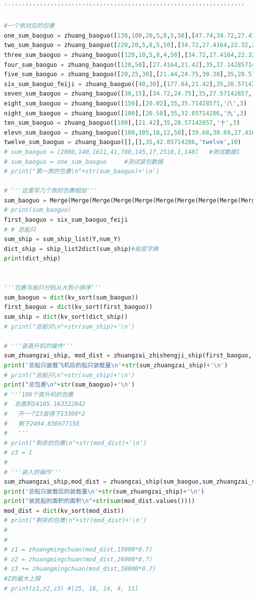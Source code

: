 \documentclass{whutmod}
\begin{document}
\begin{lstlisting}[language=python]
''''''''''''''''''''''''''''''''''''''''''''''''''''''''''''''''''''

#一个旅对应的包裹
one_sum_baoguo = zhuang_baoguo([130,100,20,5,8,5,50],[47.74,34.72,27.4164,22.32,21.44,24.75,21.42],54,43.51851852,'一',12)
two_sum_baoguo = zhuang_baoguo([220,20,5,8,5,50],[34.72,27.4164,22.32,21.44,24.75,21.42],54,43.51851852,'二',3)
three_sum_baoguo = zhuang_baoguo([120,10,5,8,4,50],[34.72,27.4164,22.32,21.44,24.75,21.42],54,41.6666667,'三',3)
four_sum_baoguo = zhuang_baoguo([120,50],[27.4164,21.42],35,37.14285714,'四',3)
five_sum_baoguo = zhuang_baoguo([20,25,30],[21.44,24.75,30.38],35,28.5714285,'五',3)
six_sum_baoguo_feiji = zhuang_baoguo([40,30],[177.84,21.42],35,28.57142857,'六',5)#带飞机的旅，先装！！！！！！！
seven_sum_baoguo = zhuang_baoguo([30,15],[34.72,24.75],35,27.57142857,'七',5)
eight_sum_baoguo = zhuang_baoguo([150],[20.02],35,35.71428571,'八',3)
night_sum_baoguo = zhuang_baoguo([100],[20.58],35,32.85714286,'九',3)
ten_sum_baoguo = zhuang_baoguo([100],[21.42],35,28.57142857,'十',3)
elevn_sum_baoguo = zhuang_baoguo([100,105,18,12,50],[39.68,30.69,27.4164,22.32,21.42],35,71.42857143,'eleven',6)
twelve_sum_baoguo = zhuang_baoguo([],[],35,42.85714286,'twelve',10)
# sum_baoguo = [2000,140,1611,41,780,145,17,2510,1,148]   #测试数据1
# sum_baoguo = one_sum_baoguo     #测试装包数据
# print("第一旅的包裹\n"+str(sum_baoguo)+'\n')

# '''这里写几个旅的包裹相加'''
sum_baoguo = Merge(Merge(Merge(Merge(Merge(Merge(Merge(Merge(Merge(Merge(one_sum_baoguo,two_sum_baoguo),three_sum_baoguo),four_sum_baoguo),five_sum_baoguo),seven_sum_baoguo),eight_sum_baoguo),night_sum_baoguo),ten_sum_baoguo),elevn_sum_baoguo),twelve_sum_baoguo)# +.........
# print(sum_baoguo)
first_baoguo = six_sum_baoguo_feiji
# # 总船只
sum_ship = sum_ship_list(Y,num_Y)
dict_ship = ship_list2dict(sum_ship)#船变字典
print(dict_ship)


'''包裹与船只分别从大到小排序'''
sum_baoguo = dict(kv_sort(sum_baoguo))
first_baoguo = dict(kv_sort(first_baoguo))
sum_ship = dict(kv_sort(dict_ship))
# print("总船只\n"+str(sum_ship)+'\n')

# '''装直升机的操作'''
sum_zhuangzai_ship, mod_dist = zhuangzai_zhishengji_ship(first_baoguo, sum_ship)
print('总船只装载飞机后的船只装载量\n'+str(sum_zhuangzai_ship)+'\n')
# print("总船只\n"+str(sum_ship)+'\n')
print("总包裹\n"+str(sum_baoguo)+'\n')
# '''106个直升机的包裹
#  总面积24105.163322842
#   开一个Z3装得下13300*2
#   剩下2494.836677158
#   '''
# print("剩余的包裹\n"+str(mod_dist)+'\n')
# z3 = 1
#
# '''装人的操作'''
sum_zhuangzai_ship,mod_dist = zhuangzai_ship(sum_baoguo,sum_zhuangzai_ship)
print('总船只装载后的装载量\n'+str(sum_zhuangzai_ship)+'\n')
print("装民船的面积的面积\n"+str(sum(mod_dist.values())))
mod_dist = dict(kv_sort(mod_dist))
# print("剩余的包裹\n"+str(mod_dist)+'\n')
#
#
# z1 = zhuangmingchuan(mod_dist,19000*0.7)
# z2 = zhuangmingchuan(mod_dist,26000*0.7)
# z3 += zhuangmingchuan(mod_dist,38000*0.7)
#Z的最大上限
# print(z1,z2,z3) #[25, 18, 14, 4, 11]


\end{lstlisting}
\end{document}
